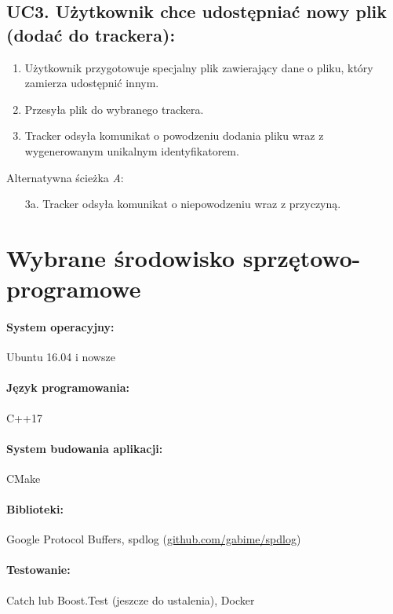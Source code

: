 \documentclass[11pt]{article}
\begin{document}
\subsection{UC3. Użytkownik chce udostępniać nowy plik (dodać do trackera):}
\begin{enumerate}
	\item Użytkownik przygotowuje specjalny plik zawierający dane o pliku, który zamierza udostępnić innym.
	\item Przesyła plik do wybranego trackera.
	\item Tracker odsyła komunikat o powodzeniu dodania pliku wraz z wygenerowanym unikalnym identyfikatorem.
\end{enumerate}
Alternatywna ścieżka \textsl{A}:
\begin{itemize}
	\item [3a.] Tracker odsyła komunikat o niepowodzeniu wraz z przyczyną.
\end{itemize}
\section{Wybrane środowisko sprzętowo-programowe}
\paragraph{System operacyjny:}
Ubuntu 16.04 i nowsze
\paragraph{Język programowania:}
 C++17
\paragraph{System budowania aplikacji:}
CMake
\paragraph{Biblioteki:}
Google Protocol Buffers, spdlog (\url{github.com/gabime/spdlog})
\paragraph{Testowanie:}
Catch lub Boost.Test (jeszcze do ustalenia), Docker
\end{document}

